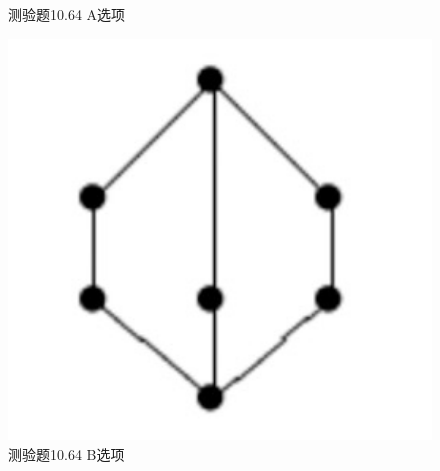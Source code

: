 \documentclass[UTF8, heading=true]{ctexart}
\begin{document}
\begin{figure}[H]
\begin{minipage}[t]{0.14\textwidth}
      \vspace{-0.3cm}
      \caption{测验题10.64 A选项}
  \end{minipage}
  \hspace{0.23\textwidth} %
  \begin{minipage}[t]{0.2\textwidth}
      \centering
      \includegraphics[width=1\textwidth]{10.64_2.jpg} %
      \vspace{-0.3cm}
      \caption{测验题10.64 B选项}
\end{minipage}
\end{figure}
\end{document}
